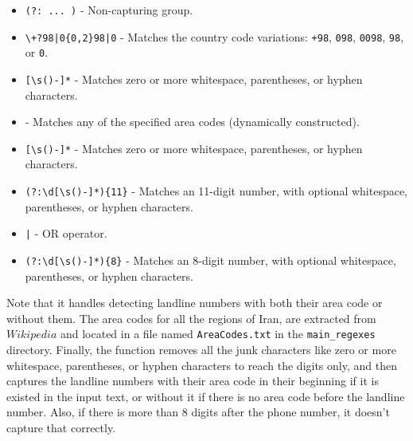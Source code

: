 \documentclass{solutionclass} %
\def\co#1{\texttt{#1}}
\begin{document}
\begin{solution}
  \begin{itemize}
    \item \texttt{(?: ... )} - Non-capturing group.
    \item \texttt{\textbackslash+?98|0\{0,2\}98|0} - Matches the country code variations: \texttt{+98}, \texttt{098}, \texttt{0098}, \texttt{98}, or \texttt{0}.
    \item \texttt{[\textbackslash s()-]*} - Matches zero or more whitespace, parentheses, or hyphen characters.
    \item \texttt{} - Matches any of the specified area codes (dynamically constructed).
    \item \texttt{[\textbackslash s()-]*} - Matches zero or more whitespace, parentheses, or hyphen characters.
    \item \texttt{(?:\textbackslash d[\textbackslash s()-]*)\{11\}} - Matches an 11-digit number, with optional whitespace, parentheses, or hyphen characters.
    \item \texttt{|} - OR operator.
    \item \texttt{(?:\textbackslash d[\textbackslash s()-]*)\{8\}} - Matches an 8-digit number, with optional whitespace, parentheses, or hyphen characters.
  \end{itemize}

Note that it handles detecting landline numbers with both their area code or without them. The area codes for all the regions of Iran, are extracted from $Wikipedia$ and located in a file named \co{AreaCodes.txt} in the \co{main\_regexes} directory.
 Finally, the function removes all the junk characters like zero or more whitespace, parentheses, or hyphen characters to reach the digits only, and then captures the landline numbers with their area code in their beginning if it is existed in the input text, or without it if there is no area code before the landline number. Also, if there is more than 8 digits after the phone number, it doesn't capture that correctly.
\end{solution}
\end{document}
